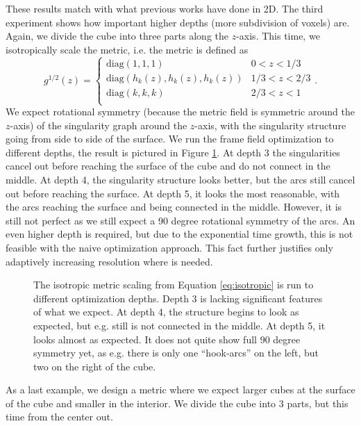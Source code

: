 \documentclass[../thesis.tex]{subfiles}
\begin{document}
These results match with what previous works have done in 2D.
The third experiment shows how important higher depths (more subdivision of voxels) are.
Again, we divide the cube into three parts along the $z$-axis.
This time, we isotropically scale the metric, i.e. the metric is defined as
\begin{equation}\label{eq:isotropic} 
g^{1/2}(z) = \begin{cases}
    \mathrm{diag}(1,1,1) &0 < z < 1/3 \\
    \mathrm{diag}(h_k(z), h_k(z), h_k(z)) &1/3 < z < 2/3 \\
    \mathrm{diag}(k,k,k) &2/3 < z < 1 \\
\end{cases}.\end{equation}
We expect rotational symmetry (because the metric field is symmetric around the $z$-axis) of the singularity graph around the $z$-axis,
with the singularity structure going from side to side of the surface. We run the frame field optimization to different
depths, the result is pictured in Figure \ref{fig:isotropic}. At depth 3 the singularities
cancel out before reaching the surface of the cube and do not connect in the middle. At depth 4, the singularity structure
looks better, but the arcs still cancel out before reaching the surface. At depth 5, it looks
the most reasonable, with the arcs reaching the surface and being connected in the middle.
However, it is still not perfect as we still expect a 90 degree rotational symmetry of the arcs.
An even higher depth is required, but due to the exponential time growth, this is not feasible
with the naive optimization approach. This fact further justifies only adaptively increasing resolution where is needed.
\begin{figure}[htb]
    \centering
    \def\svgwidth{\textwidth}
    
    \caption{The isotropic metric scaling from Equation \ref{eq:isotropic} is run to different optimization depths.
    Depth 3 is lacking significant features of what we expect. At depth 4, the structure begins to look as expected, but e.g. still is not connected in the middle.
    At depth 5, it looks almost as expected. It does not quite show full 90 degree symmetry yet, as e.g. there is only one ``hook-arcs'' on the left, but two on the right of the cube.}
    \label{fig:isotropic}
\end{figure}
As a last example, we design a metric where we expect larger cubes at the surface of the cube and smaller in the interior.
We divide the cube into 3 parts, but this time from the center out.
\end{document}

